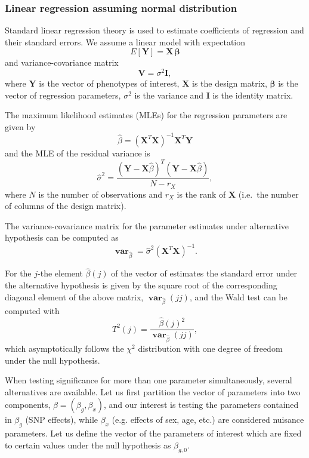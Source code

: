 \documentclass[12pt,a4paper]{article}
\DeclareMathOperator{\var}{\mathbf{var}}
\begin{document}
\subsubsection{Linear regression assuming normal distribution}
Standard linear regression theory is used to estimate coefficients of
regression and their standard errors. We assume a linear model with
expectation
\begin{equation}
  E[\mathbf{Y}] = \mathbf{X}\, \boldsymbol{\beta}
\label{expectation}
\end{equation}
and variance-covariance matrix
$$
\mathbf{V} = \sigma^2 \mathbf{I},
$$
where $\mathbf{Y}$ is the vector of phenotypes of interest,
$\mathbf{X}$ is the design matrix, $\boldsymbol{\beta}$ is the vector
of regression parameters, $\sigma^2$ is the variance and $\mathbf{I}$
is the identity matrix.

The maximum likelihood estimates (MLEs) for the regression parameters
are given by
\begin{equation}
  \hat{\beta} = (\mathbf{X}^T \mathbf{X})^{-1} \mathbf{X}^T \mathbf{Y}
\end{equation}
and the MLE of the residual variance is
\begin{equation}
  \hat{\sigma}^2 = \frac{(\mathbf{Y} - \mathbf{X}\hat{\beta})^T
    (\mathbf{Y} - \mathbf{X}\hat{\beta})} {N-r_X},
\end{equation}
where $N$ is the number of observations and $r_X$ is the rank of
$\mathbf{X}$ (i.e.~the number of columns of the design matrix).

The variance-covariance matrix for the parameter estimates under
alternative hypothesis can be computed as
\begin{equation}
\var_{\hat{\beta}} = \hat{\sigma}^2 (\mathbf{X}^T\mathbf{X})^{-1}.
\end{equation}

For the $j$-the element $\hat{\beta}(j)$ of the vector of estimates the standard
error under the alternative hypothesis is given by the square root of the
corresponding diagonal element of the above matrix, $\var_{\hat{\beta}}(jj)$,
and the Wald test can be computed with
$$
T^2(j) = \frac{ \hat{\beta}(j)^2 }{ \var_{\hat{\beta}}(jj) },
$$
which asymptotically follows the $\chi^2$ distribution with one degree of
freedom under the null hypothesis.

When testing significance for more than one parameter simultaneously,
several alternatives are available. Let us first partition the vector of
parameters into two components, $\beta = (\beta_g,\beta_x)$, and our
interest is testing the parameters contained in $\beta_g$ (SNP effects),
while $\beta_x$ (e.g. effects of sex, age, etc.) are considered nuisance
parameters. Let us define the vector of the parameters of interest
which are fixed to certain values under the null hypothesis as
$\beta_{g,0}$.
\end{document}
